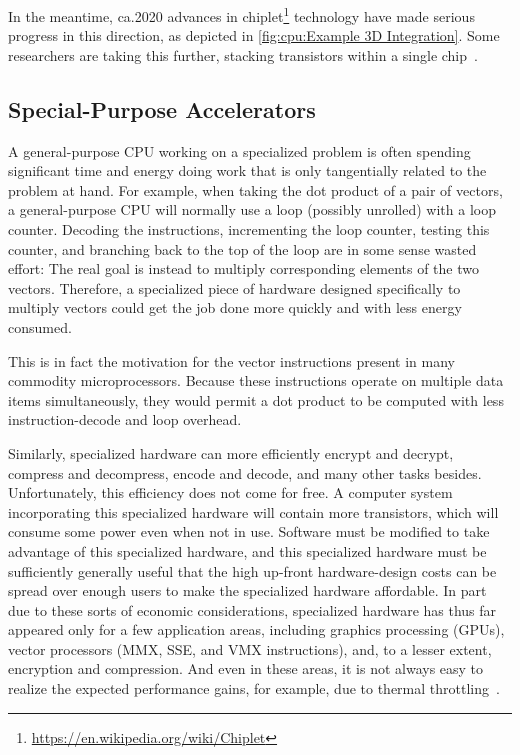 In the meantime, ca.\@ 2020 advances in chiplet\footnote{
	\url{https://en.wikipedia.org/wiki/Chiplet}}
technology have made serious progress in this direction, as depicted in
\cref{fig:cpu:Example 3D Integration}.
Some researchers are taking this further, stacking transistors within
a single chip~\cite{SamuelKMoore2020StackedCMOS,MarkoRadosavljevic2022StackedCMOS}.

\subsection{Special-Purpose Accelerators}
\label{sec:cpu:Special-Purpose Accelerators}

A general-purpose CPU working on a specialized problem is often spending
significant time and energy doing work that is only tangentially related
to the problem at hand.
For example, when taking the dot product of a pair of vectors, a
general-purpose CPU will normally use a loop (possibly unrolled)
with a loop counter.
Decoding the instructions, incrementing the loop counter, testing this
counter, and branching back to the
top of the loop are in some sense wasted effort:
The real goal is instead to multiply corresponding elements of the
two vectors.
Therefore, a specialized piece of hardware designed specifically to
multiply vectors could get the job done more quickly and with less
energy consumed.

This is in fact the motivation for the vector instructions present in
many commodity microprocessors.
Because these instructions operate on multiple data items simultaneously,
they would permit a dot product to be computed with less instruction-decode
and loop overhead.

Similarly, specialized hardware can more efficiently encrypt and decrypt,
compress and decompress, encode and decode, and many other tasks besides.
Unfortunately, this efficiency does not come for free.
A computer system incorporating this specialized hardware will contain
more transistors, which will consume some power even when not in use.
Software must be modified to take advantage of this specialized hardware,
and this specialized hardware must be sufficiently generally useful
that the high up-front hardware-design costs can be spread over enough
users to make the specialized hardware affordable.
In part due to these sorts of economic considerations, specialized
hardware has thus far appeared only for a few application areas,
including graphics processing (GPUs), vector processors (MMX, SSE,
and VMX instructions), and, to a lesser extent, encryption and
compression.
And even in these areas, it is not always easy to realize the expected
performance gains, for example, due to thermal
throttling~\cite{VladKrasnov2017SIMDfreqscale,DanielLemire2018SIMDfreqscale,TravisDowns2020SIMDfreqscale}.

